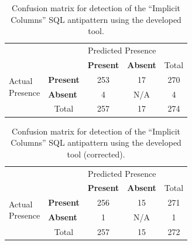 \begin{table}[H]
    \centering
    \caption{Confusion matrix for detection of the “Implicit Columns” SQL antipattern using the developed tool.}
    \label{tab:implicitColumnsConfusion}
    \begin{tabular}{l|l|c|c|c}
        \multicolumn{2}{c}{}&\multicolumn{2}{c}{Predicted Presence}&\\
        \cline{3-4}
        \multicolumn{2}{c|}{}&\textbf{Present}&\textbf{Absent}&\multicolumn{1}{c}{Total}\\
        \cline{2-4}
        \multirow{2}{1.5cm}{Actual\\Presence}& \textbf{Present} & 253 & 17 & 270\\
        \cline{2-4}
        & \textbf{Absent} & 4 & N/A & 4\\
        \cline{2-4}
        \multicolumn{1}{c}{} & \multicolumn{1}{c}{Total} & \multicolumn{1}{c}{257} & \multicolumn{1}{c}{17} & \multicolumn{1}{c}{274}\\
    \end{tabular}
\end{table}

\begin{table}[H]
    \centering
    \caption{Confusion matrix for detection of the “Implicit Columns” SQL antipattern using the developed tool (corrected).}
    \label{tab:implicitColumnsConfusionCorrected}
    \begin{tabular}{l|l|c|c|c}
        \multicolumn{2}{c}{}&\multicolumn{2}{c}{Predicted Presence}&\\
        \cline{3-4}
        \multicolumn{2}{c|}{}&\textbf{Present}&\textbf{Absent}&\multicolumn{1}{c}{Total}\\
        \cline{2-4}
        \multirow{2}{1.5cm}{Actual\\Presence}& \textbf{Present} & 256 & 15 & 271\\
        \cline{2-4}
        & \textbf{Absent} & 1 & N/A & 1\\
        \cline{2-4}
        \multicolumn{1}{c}{} & \multicolumn{1}{c}{Total} & \multicolumn{1}{c}{257} & \multicolumn{1}{c}{15} & \multicolumn{1}{c}{272}\\
    \end{tabular}
\end{table}

